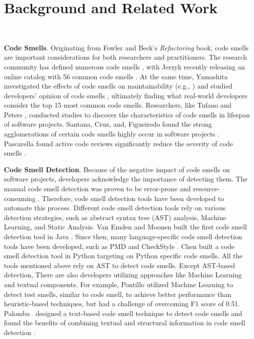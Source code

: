 \vspace*{-0.5em}

\section{Background and Related Work}~\label{sec:background}

\vspace*{-1em}


{\bf Code Smells}.
Originating from Fowler and Beck's \textit{Refactoring} book, code smells are
important considerations for both researchers and practitioners.
The research community has defined numerous code smells
\cite{Pysmell,SQLAntipatterns,CleanCode,RefactoringWorkbook}, with Jerzyk
recently releasing an online catalog with 56 common code smells
\cite{Jerzyk2023}.
At the same time, Yamashita investigated the effects of code smells on
maintainability (e.g., \cite{6392174, 6405287}) and studied developers' opinion
of code smells \cite{developersCare}, ultimately finding what real-world
developers consider the top 15 most common code smells.
Researchers, like Tufano \cite{whenandwhy} and Peters \cite{lifespan},
conducted studies to discover the characteristics of code smells in lifespan of
software projects.
Santana, Cruz, and, Figueiredo found the strong agglomerations of certain code
smells highly occur in software projects \cite{Santana}.
Pascarella found active code reviews significantly reduce the severity of code
smells \cite{Pascarella}.

{\bf Code Smell Detection}. Because of the negative impact of code smells on
software projects, developers acknowledge the importance of detecting them. The
manual code smell detection was proven to be error-prone and resource-consuming
\cite{DetectingDefectsInObject}. Therefore, code smell detection tools have been
developed to automate this process. Different code smell detection tools rely on
various detection strategies, such as abstract syntax tree (AST) analysis,
Machine Learning, and Static Analysis. Van Emden and Moonen built the first code
smell detection tool in Java \cite{1173068}. Since then, many language-specific
code smell detection tools have been developed, such as PMD \cite{PMD} and
CheckStyle \cite{CheckStyle}. Chen \cite{Pysmell} built a code smell detection
tool in Python targeting on Python specific code smells. All the tools mentioned
above rely on AST to detect code smells. Except AST-based detection, There are
also developers utilizing approaches like Machine Learning and textual
components. For example, Pontillo utilized Machine Learning to detect test
smells, similar to code smell, to achieve better performance than
heuristic-based techniques, but had a challenge of overcoming F1 score of 0.51.
Palomba~\etal{} designed a text-based code smell technique to detect code smells
and found the benefits of combining textual and structural information in code
smell detection \cite{Palomba}.

